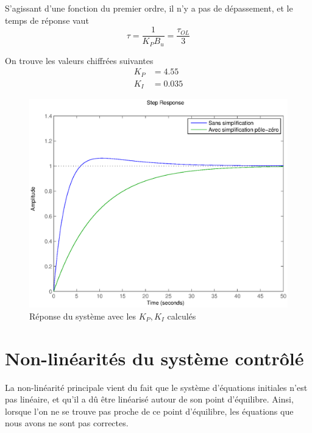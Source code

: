 \documentclass[frenchb, paper=a4, fontsize=11pt]{scrartcl}
\numberwithin{equation}{section}					%
\numberwithin{figure}{section}					%
\numberwithin{table}{section}						%
\begin{document}
S'agissant d'une fonction du premier ordre, il n'y a pas de dépassement, et le temps de réponse vaut 
\begin{equation}
\tau = \frac{1}{K_P B_u} = \frac{\tau_{OL}}{3} 
\end{equation}

On trouve les valeurs chiffrées suivantes
\begin{align}
K_P &= 4.55\\
K_I &= 0.035
\end{align}

\begin{figure}[!ht]
	\centering
	\includegraphics[width=0.6\linewidth]{img/final_values.eps}
	\caption{Réponse du système avec les $K_P,K_I$ calculés}
	\label{fig:final_values}
\end{figure}

\section{Non-linéarités du système contrôlé}
La non-linéarité principale vient du fait que le système d'équations initiales n'est pas linéaire, et qu'il a dû être linéarisé autour de son point d'équilibre. Ainsi, lorsque l'on ne se trouve pas proche de ce point d'équilibre, les équations que nous avons ne sont pas correctes.
\end{document}
